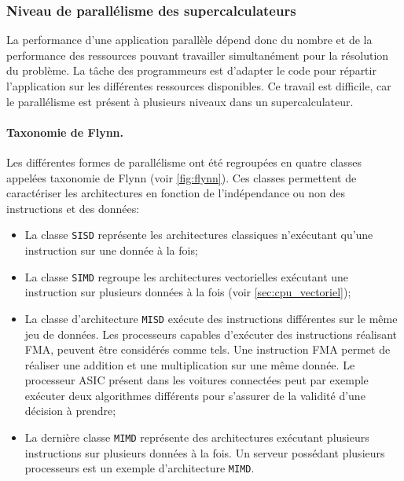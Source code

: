     \subsubsection{Niveau de parallélisme des supercalculateurs}
    
        La performance d'une application parallèle dépend donc du nombre et de la performance des ressources pouvant travailler simultanément pour la résolution du problème. La tâche des programmeurs est d'adapter le code pour répartir l'application sur les différentes ressources disponibles. Ce travail est difficile, car le parallélisme est présent à plusieurs niveaux dans un supercalculateur.
        
        
        \paragraph{Taxonomie de Flynn.}
             Les différentes formes de parallélisme ont été regroupées en quatre classes appelées taxonomie de Flynn \cite{Flynn2011} (voir \autoref{fig:flynn}). Ces classes permettent de caractériser les architectures en fonction de l'indépendance ou non des instructions et des données:
             \begin{itemize}
                \item La classe \verb=SISD= représente les architectures classiques n'exécutant qu'une instruction sur une donnée à la fois;
                
                \item La classe \verb=SIMD= regroupe les architectures vectorielles exécutant une instruction sur plusieurs données à la fois (voir \autoref{sec:cpu_vectoriel});
                
                \item La classe d'architecture \verb|MISD| exécute des instructions différentes sur le même jeu de données. Les processeurs capables d'exécuter des instructions réalisant \gls{FMA}, peuvent être considérés comme tels. Une instruction FMA permet de réaliser une addition et une multiplication sur une même donnée. Le processeur ASIC présent dans les voitures connectées peut par exemple exécuter deux algorithmes différents pour s'assurer de la validité d'une décision à prendre;
                
                \item La dernière classe \verb|MIMD| représente des architectures exécutant plusieurs instructions sur plusieurs données à la fois. Un serveur possédant plusieurs processeurs est un exemple d'architecture \verb|MIMD|. 
            \end{itemize}
             
